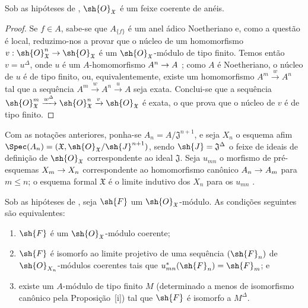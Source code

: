 \documentclass[oneside]{amsart}
\makeatletter
\renewcommand{\leq}{\leqslant}
\newcommand{\ega@arrow}[2]{\mathchoice{#1}{#2}{#2}{#2}}
\renewcommand{\to}{\ega@arrow{\longrightarrow}{\rightarrow}}
\let\EGAOriginalLabel\label
\renewcommand{\label}[1]{\phantomsection\EGAOriginalLabel{#1}}
\makeatother
\begin{document}
\begin{proposition}[10.10.3]
\label{I.10.10.3}
Sob as hipóteses de , $\sh{O}_\mathfrak{X}$ é um feixe coerente de anéis.
\end{proposition}

\begin{proof}
Se $f\in A$, sabe-se que $A_{\{f\}}$ é um anel ádico Noetheriano  e, como a questão é local, reduzimo-nos  a provar que o núcleo de um homomorfismo $v:\sh{O}_\mathfrak{X}^n\to\sh{O}_\mathfrak{X}$ é um $\sh{O}_\mathfrak{X}$-módulo de tipo finito.
Temos então $v=u^\Delta$, onde $u$ é um $A$-homomorfismo $A^n\to A$ ; como $A$ é Noetheriano, o núcleo de $u$ é de tipo finito, ou, equivalentemente, existe um homomorfismo $A^m\xrightarrow{w}A^n$ tal que a sequência $A^m\xrightarrow{w}A^n\xrightarrow{u}A$ seja exata.
Conclui-se  que a sequência $\sh{O}_\mathfrak{X}^m\xrightarrow{w^\Delta}\sh{O}_\mathfrak{X}^n\xrightarrow{v}\sh{O}_\mathfrak{X}$ é exata, o que prova que o núcleo de $v$ é de tipo finito.
\end{proof}

\begin{env}[10.10.4]
\label{I.10.10.4}
Com as notações anteriores, ponha-se $A_n=A/\mathfrak{J}^{n+1}$, e seja $X_n$ o esquema afim $\Spec(A_n)=(\mathfrak{X},\sh{O}_\mathfrak{X}/\sh{J}^{n+1})$, sendo $\sh{J}=\mathfrak{J}^\Delta$ o feixe de ideais de definição de $\sh{O}_\mathfrak{X}$ correspondente ao ideal $\mathfrak{J}$.
Seja $u_{mn}$ o morfismo de pré-esquemas $X_m\to X_n$ correspondente ao homomorfismo canônico $A_n\to A_m$ para $m\leq n$; o esquema formal $\mathfrak{X}$ é o limite indutivo dos $X_n$ para os $u_{mn}$ .
\end{env}

\begin{proposition}[10.10.5]
\label{I.10.10.5}
Sob as hipóteses de , seja $\sh{F}$ um $\sh{O}_\mathfrak{X}$-módulo.
As condições seguintes são equivalentes:
\begin{enumerate}
  \item[\rm{(a)}] $\sh{F}$ é um $\sh{O}_\mathfrak{X}$-módulo coerente;
  \item[\rm{(b)}] $\sh{F}$ é isomorfo ao limite projetivo  de uma sequência $(\sh{F}_n)$ de $\sh{O}_{X_n}$-módulos coerentes tais que $u_{mn}^*(\sh{F}_n)=\sh{F}_m$; e
  \item[\rm{(c)}] existe um $A$-módulo de tipo finito $M$ (determinado a menos de isomorfismo canônico pela Proposição~[i]) tal que $\sh{F}$ é isomorfo a $M^\Delta$.
\end{enumerate}
\end{proposition}
\end{document}
